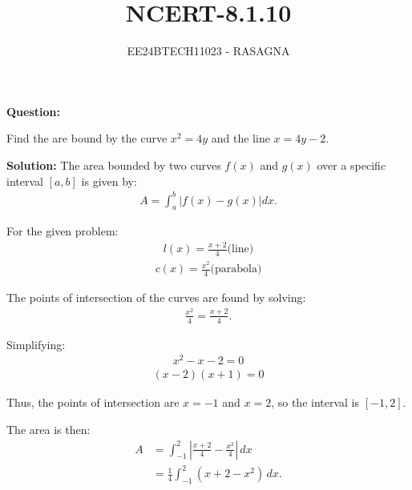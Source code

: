 \documentclass[journal]{IEEEtran}
\begin{document}

\vspace{3cm}

\title{NCERT-8.1.10}
\author{EE24BTECH11023 - RASAGNA}

{\let\newpage\relax\maketitle}

\renewcommand{\thefigure}{\theenumi}
\renewcommand{\thetable}{\theenumi}
\setlength{\intextsep}{10pt} %


\renewcommand{\thetable}{\theenumi}
\textbf{Question:}

Find the are bound by the curve $x^2=4y$ and the line $x=4y-2$.


\textbf{Solution:}
The area bounded by two curves $f(x)$ and $g(x)$ over a specific interval $[a, b]$ is given by:
\begin{align}
A=\int_a^b|f(x) - g(x)| dx.
\end{align}

For the given problem:
\begin{align}
l(x)=\frac{x+2}{4} \text{(line)}
\end{align}
\begin{align}
    c(x)= \frac{x^2}{4} \text{(parabola)}
\end{align}

The points of intersection of the curves are found by solving:
\begin{align}
\frac{x^2}{4}= \frac{x + 2}{4}.
\end{align}

Simplifying:
\begin{align}
x^2 - x - 2 = 0
\end{align}
\begin{align}
    (x - 2)(x + 1)= 0
\end{align}

Thus, the points of intersection are $x = -1$ and $x = 2$, so the interval is $[-1, 2]$.

The area is then:
\begin{align}
A &= \int_{-1}^2 \left| \frac{x + 2}{4} - \frac{x^2}{4} \right| \, dx \\
&= \frac{1}{4} \int_{-1}^2 \left( x + 2 - x^2 \right) \, dx.
\end{align}
\end{document}
